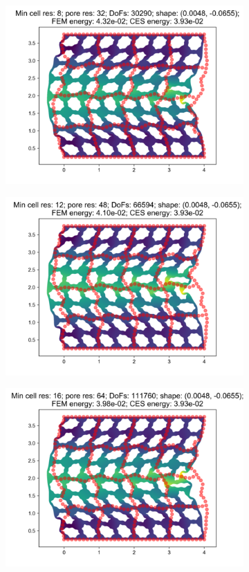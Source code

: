 \begin{figure}[H]
\begin{subfigure}{.45\textwidth}
\end{subfigure}
\begin{subfigure}{.45\textwidth}
  \centering
  \includegraphics[width=.8\linewidth]{lces/vis_compression/bm_0_mesh_3.png}
\end{subfigure}
\newline
\begin{subfigure}{.45\textwidth}
  \centering
  \includegraphics[width=.8\linewidth]{lces/vis_compression/bm_0_mesh_4.png}
\end{subfigure}
\begin{subfigure}{.45\textwidth}
  \centering
  \includegraphics[width=.8\linewidth]{lces/vis_compression/bm_0_mesh_5.png}
\end{subfigure}
\end{figure}

